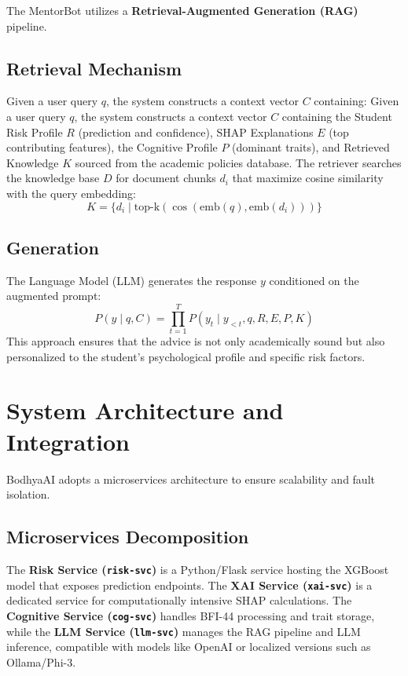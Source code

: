 \documentclass[12pt,a4paper]{report}
\begin{document}
The MentorBot utilizes a \textbf{Retrieval-Augmented Generation (RAG)}~\cite{gao2023rag} pipeline.

\subsection{Retrieval Mechanism}
Given a user query $q$, the system constructs a context vector $C$ containing:
Given a user query $q$, the system constructs a context vector $C$ containing the Student Risk Profile $R$ (prediction and confidence), SHAP Explanations $E$ (top contributing features), the Cognitive Profile $P$ (dominant traits), and Retrieved Knowledge $K$ sourced from the academic policies database.
The retriever searches the knowledge base $D$ for document chunks $d_i$ that maximize cosine similarity with the query embedding:
\[
K = \{d_i \mid \text{top-k}(\cos(\text{emb}(q), \text{emb}(d_i))) \}
\]

\subsection{Generation}
The Language Model (LLM) generates the response $y$ conditioned on the augmented prompt:
\[
P(y \mid q, C) = \prod_{t=1}^{T} P(y_t \mid y_{<t}, q, R, E, P, K)
\]
This approach ensures that the advice is not only academically sound but also personalized to the student's psychological profile and specific risk factors.

\section{System Architecture and Integration}

BodhyaAI adopts a microservices architecture to ensure scalability and fault isolation.

\subsection{Microservices Decomposition}
The \textbf{Risk Service (\texttt{risk-svc})} is a Python/Flask service hosting the XGBoost model that exposes prediction endpoints. The \textbf{XAI Service (\texttt{xai-svc})} is a dedicated service for computationally intensive SHAP calculations. The \textbf{Cognitive Service (\texttt{cog-svc})} handles BFI-44 processing and trait storage, while the \textbf{LLM Service (\texttt{llm-svc})} manages the RAG pipeline and LLM inference, compatible with models like OpenAI or localized versions such as Ollama/Phi-3.
\end{document}
